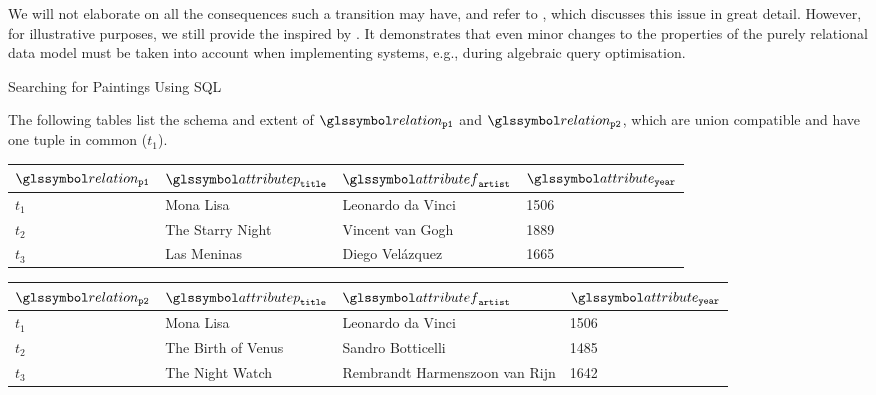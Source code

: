 We will not elaborate on all the consequences such a transition may have, and refer to \cite{Garcia:2009Database}, which discusses this issue in great detail. However, for illustrative  purposes, we still provide the  inspired by \cite{Garcia:2009Database}. It demonstrates that even minor changes to the properties of the purely relational data model must be taken into account when implementing systems, e.g., during algebraic query optimisation.

\begin{example}[label=example:bag_vs_set]{Searching for Paintings Using SQL}{}

    The following tables list the schema and extent of $\relation_{\mathtt{p1}}$ and $\relation_{\mathtt{p2}}$, which are union compatible and have one tuple in common ($t_1$).

    \begin{center}
        \begin{tabular}{ l || l | l | l |}
            $\relation_{\mathtt{p1}}$ & $\attributep_{\mathtt{title}}$  & $\attributef_{\mathtt{artist}}$  & $\attribute_{\mathtt{year}}$ \\ 
            \hline
            \hline
            $t_1$ & Mona Lisa &  Leonardo da Vinci & 1506 \\
            \hline
            $t_2$ & The Starry Night & Vincent van Gogh & 1889 \\
            \hline
            $t_3$ & Las Meninas & Diego Velázquez & 1665 \\
            \hline
        \end{tabular}
    \end{center}

    \begin{center}
        \begin{tabular}{ l || l | l | l |}
            $\relation_{\mathtt{p2}}$ & $\attributep_{\mathtt{title}}$  & $\attributef_{\mathtt{artist}}$  & $\attribute_{\mathtt{year}}$ \\ 
            \hline
            \hline
            $t_1$ & Mona Lisa &  Leonardo da Vinci & 1506 \\
            \hline
            $t_2$ & The Birth of Venus & Sandro Botticelli & 1485 \\
            \hline
            $t_3$ & The Night Watch & Rembrandt Harmenszoon van Rijn & 1642 \\
            \hline
        \end{tabular}
    \end{center}
    

\end{example}

